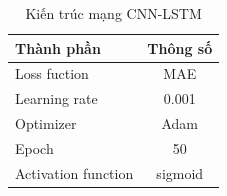 \begin{itemize}
\begin{itemize}
\begin{itemize}
                    \begin{table}[h!]
                        \caption{Kiến trúc mạng CNN-LSTM}
                        \centering
                        \begin{tabular}{|l|c|}
                        \hline
                     Thành phần  &  Thông số \\
                          \hline
                     Loss fuction & MAE \\
                     Learning rate & 0.001 \\
                    Optimizer & Adam \\
                     Epoch & 50 \\
                    Activation function & sigmoid \\
                    \hline
                        \end{tabular}
                        \label{tab:section5_3_cnn_lstm}
                    \end{table}
                   
                    \newpage
                    

\end{itemize}
\end{itemize}
\end{itemize}
